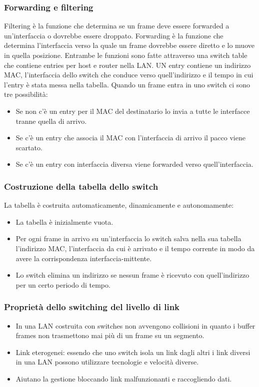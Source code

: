 \subsubsection{Forwarding e filtering}
Filtering \`e la funzione che determina se un frame deve essere forwarded a un'interfaccia o dovrebbe essere droppato. Forwarding \`e la funzione che determina l'interfaccia verso la quale un frame dovrebbe
essere diretto e lo muove in quella posizione. Entrambe le funzioni sono fatte attraverso una switch table che contiene entries per host e router nella LAN. UN entry contiene un indirizzo MAC, l'interfaccia dello
switch che conduce verso quell'indirizzo e il tempo in cui l'entry \`e stata messa nella tabella. Quando un frame entra in uno switch ci sono tre possibilit\`a:
\begin{itemize}
\item Se non c'\`e un entry per il MAC del destinatario lo invia a tutte le interfacce tranne quella di arrivo.
\item Se c'\`e un entry che associa il MAC con l'interfaccia di arrivo il pacco viene scartato. 
\item Se c'\`e un entry con interfaccia diversa viene forwarded verso quell'interfaccia.
\end{itemize}
\subsubsection{Costruzione della tabella dello switch}
La tabella \`e costruita automaticamente, dinamicamente e autonomamente:
\begin{itemize}
\item La tabella \`e inizialmente vuota.
\item Per ogni frame in arrivo su un'interfaccia lo switch salva nella sua tabella l'indirizzo MAC, l'interfaccia da cui \`e arrivato e il tempo corrente in modo da avere la corrispondenza interfaccia-mittente.
\item Lo switch elimina un indirizzo se nessun frame \`e ricevuto con quell'indirizzo per un certo periodo di tempo. 
\end{itemize}
\subsubsection{Propriet\`a dello switching del livello di link}
\begin{itemize}
\item In una LAN costruita con switches non avvengono collisioni in quanto i  buffer frames non trasmettono mai pi\`u di un frame su un segmento.
\item Link eterogenei: essendo che uno switch isola un link dagli altri i link diversi in una LAN possono utilizzare tecnologie e velocit\`a diverse.
\item Aiutano la gestione bloccando link malfunzionanti e raccogliendo dati. 
\end{itemize}
